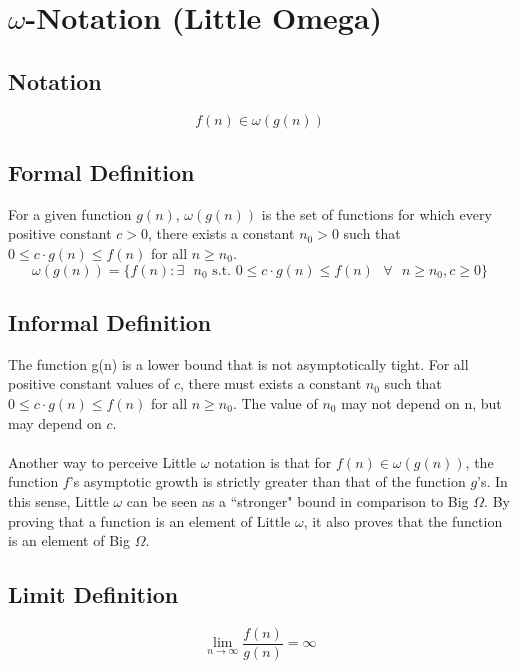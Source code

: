 \section{$\omega$-Notation (Little Omega)}

\subsection*{Notation}
$$
f(n) \in \omega(g(n))
$$

\subsection*{Formal Definition}
For a given function $g(n)$, $\omega(g(n))$ is the set  of functions for which every positive constant $c > 0$, there exists a constant $n_0 > 0$ such that $0 \leq c \cdot g(n) \leq f(n)$ for all $n \geq n_0$.
$$
\omega(g(n)) = \{ f(n) : \exists \text{ } n_0 \text{ s.t. } 0 \leq c \cdot g(n) \leq f(n) \text{ } \forall \text{ } n \geq n_0, c \geq 0 \}
$$

\subsection*{Informal Definition}
The function g(n) is a lower bound that is not asymptotically tight. For all positive constant values of $c$, there must exists a constant $n_0$ such that $0 \leq c \cdot g(n) \leq f(n)$ for all $n \geq n_0$. The value of $n_0$ may not depend on n, but may depend on $c$.\\\\
Another way to perceive Little $\omega$ notation is that for $f(n) \in \omega(g(n))$, the function $f$'s asymptotic growth is strictly greater than that of the function $g$'s. In this sense, Little $\omega$ can be seen as a ``stronger" bound in comparison to Big $\Omega$. By proving that a function is an element of Little $\omega$, it also proves that the function is an element of Big $\Omega$.

\subsection*{Limit Definition}
$$
\lim\limits_{n\to\infty} \frac{f(n)}{g(n)} = \infty
$$